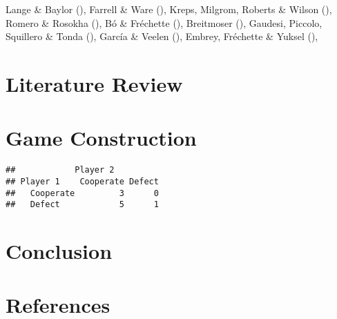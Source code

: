 \documentclass[11pt,preprint]{elsarticle}
\numberwithin{equation}{section}
\numberwithin{figure}{section}
\numberwithin{table}{section}
\begin{document}
Lange \& Baylor (), Farrell \&
Ware (), Kreps, Milgrom,
Roberts \& Wilson (), Romero \&
Rosokha (), Bó \& Fréchette
(), Breitmoser
(), Gaudesi, Piccolo,
Squillero \& Tonda (), García
\& Veelen (), Embrey, Fréchette \&
Yuksel (),

\section{\texorpdfstring{Literature
Review\label{litreview}}{Literature Review}}\label{literature-review}

\section{Game Construction}\label{game-construction}

\begin{verbatim}
##            Player 2
## Player 1    Cooperate Defect
##   Cooperate         3      0
##   Defect            5      1
\end{verbatim}

\section{Conclusion}\label{conclusion}

\newpage

\section*{References}\label{references}
\end{document}
